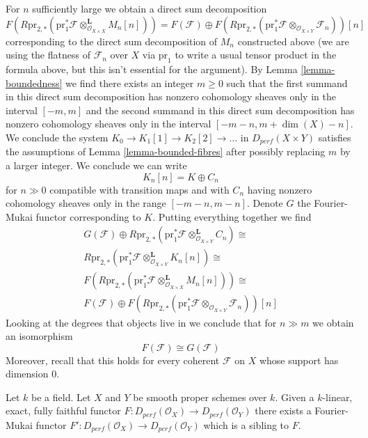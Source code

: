 For $n$ sufficiently large we obtain a direct sum decomposition
$$
F(R\text{pr}_{2, *}(\text{pr}_1^*\mathcal{F}
\otimes^\mathbf{L}_{\mathcal{O}_{X \times X}} M_n[n]))
=
F(\mathcal{F}) \oplus
F(R\text{pr}_{2, *}(
\text{pr}_1^*\mathcal{F} \otimes_{\mathcal{O}_{X \times Y}} \mathcal{F}_n
))[n]
$$
corresponding to the direct sum decomposition of $M_n$ constructed above
(we are using the flatness of $\mathcal{F}_n$ over $X$ via $\text{pr}_1$
to write a usual tensor product in the formula above, but this isn't
essential for the argument).
By Lemma \ref{lemma-boundedness} we find there exists an integer $m \geq 0$
such that the first summand in this direct sum decomposition has nonzero
cohomology sheaves only in the interval $[-m, m]$ and the
second summand in this direct sum decomposition has nonzero cohomology
sheaves only in the interval $[-m - n, m + \dim(X) - n]$.
We conclude the system $K_0 \to K_1[1] \to K_2[2] \to \ldots$
in $D_{perf}(X \times Y)$ satisfies the assumptions of
Lemma \ref{lemma-bounded-fibres} after possibly replacing $m$ by
a larger integer. We conclude we can write
$$
K_n[n] = K \oplus C_n
$$
for $n \gg 0$ compatible with transition maps and with $C_n$
having nonzero cohomology sheaves only in the range $[-m - n, m - n]$.
Denote $G$ the Fourier-Mukai functor corresponding to $K$.
Putting everything together we find
$$
\begin{matrix}
G(\mathcal{F}) \oplus
R\text{pr}_{2, *}(
\text{pr}_1^*\mathcal{F} \otimes_{\mathcal{O}_{X \times Y}}^\mathbf{L} C_n)
\cong \\
R\text{pr}_{2, *}(\text{pr}_1^*\mathcal{F}
\otimes^\mathbf{L}_{\mathcal{O}_{X \times Y}} K_n[n]) \cong \\
F(R\text{pr}_{2, *}(\text{pr}_1^*\mathcal{F}
\otimes^\mathbf{L}_{\mathcal{O}_{X \times X}} M_n[n]))
\cong \\
F(\mathcal{F}) \oplus
F(R\text{pr}_{2, *}(
\text{pr}_1^*\mathcal{F} \otimes_{\mathcal{O}_{X \times Y}} \mathcal{F}_n
))[n]
\end{matrix}
$$
Looking at the degrees that objects live in we conclude that for $n \gg m$
we obtain an isomorphism
$$
F(\mathcal{F}) \cong G(\mathcal{F})
$$
Moreover, recall that this holds for every coherent $\mathcal{F}$ on $X$
whose support has dimension $0$.

\begin{proposition}
\label{proposition-fully-faithful}
Let $k$ be a field. Let $X$ and $Y$ be smooth proper schemes over $k$.
Given a $k$-linear, exact, fully faithful functor
$F : D_{perf}(\mathcal{O}_X) \to D_{perf}(\mathcal{O}_Y)$
there exists a Fourier-Mukai functor
$F' : D_{perf}(\mathcal{O}_X) \to D_{perf}(\mathcal{O}_Y)$
which is a sibling to $F$.
\end{proposition}

